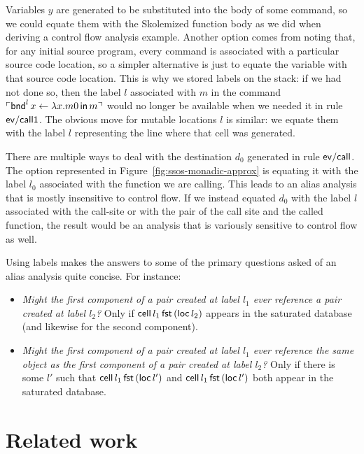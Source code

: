 Variables $y$ are generated to be substituted into the body of some
command, so we could equate them with the Skolemized function body as
we did when deriving a control flow analysis example. Another option
comes from noting that, for any initial source program, every command
is associated with a particular source code location, so a simpler
alternative is just to equate the variable with that source code
location. This is why we stored labels on the stack: if we had not
done so, then the label $l$ associated with $m$ in the command
${\ulcorner{{\sf bnd}^l\, x \leftarrow \lambda x.m0 \,{\sf in}\,m}\urcorner}$ would
no longer be available when we needed it in rule ${\sf ev/call1}$.
The obvious move for mutable locations $l$ is similar: we equate them
with the label $l$ representing the line where that cell was
generated.

There are multiple ways to deal with the destination $d_0$ generated
in rule ${\sf ev/call}$. The option represented in
Figure~\ref{fig:ssos-monadic-approx} is equating it with the label
$l_0$ associated with the function we are calling. This leads to an
alias analysis that is mostly insensitive to control flow. If we
instead equated $d_0$ with the label $l$ associated with the call-site
or with the pair of the call site and the called function, the result
would be an analysis that is variously sensitive to control flow
as well.

Using labels makes the answers to some of the primary questions
asked of an alias analysis quite concise. For instance:

\smallskip
\begin{itemize}
\item {\it Might the first component of a pair created at label $l_1$
    ever reference a pair created at label $l_2$?} Only if ${\sf
    cell}\,l_1\,{\sf fst}\,({\sf loc}\,l_2)$ appears in the saturated
    database (and likewise for the second component).
  \item {\it Might the first component of a pair created at label
      $l_1$ ever reference the same object as the first component of a
      pair created at label $l_2$?} Only if there is some $l'$ such
    that ${\sf cell}\,l_1\,{\sf fst}\,({\sf loc}\,l')$ and ${\sf
      cell}\,l_1\,{\sf fst}\,({\sf loc}\,l')$ both appear in the
    saturated database.
\end{itemize}

\section{Related work}

